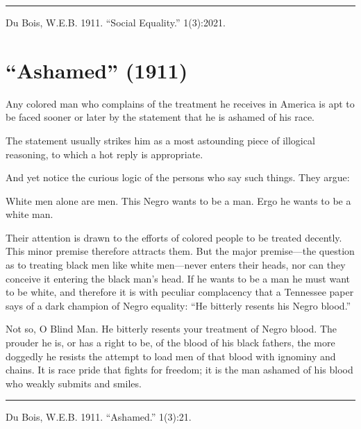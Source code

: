 \documentclass[letterpaper,10pt,english]{jupyterBook}
\begin{document}
\bigskip\hrule\bigskip


\sphinxAtStartPar
{} Du Bois, W.E.B. 1911. “Social Equality.”  1(3):20\sphinxhyphen{}21.


\section{“Ashamed” (1911)}
\label{\detokenize{Volumes/01/03/ashamed:ashamed-1911}}\label{\detokenize{Volumes/01/03/ashamed::doc}}
\sphinxAtStartPar
Any colored man who complains of the treatment he receives in America is apt to be faced sooner or later by the statement that he is ashamed of his race.

\sphinxAtStartPar
The statement usually strikes him as a most astounding piece of illogical reasoning, to which a hot reply is appropriate.

\sphinxAtStartPar
And yet notice the curious logic of the persons who say such things. They argue:

\sphinxAtStartPar
White men alone are men. This Negro wants to be a man. Ergo he wants to be a white man.

\sphinxAtStartPar
Their attention is drawn to the efforts of colored people to be treated decently. This minor premise therefore attracts them. But the major premise—the question as to treating black men like white men—never enters their heads, nor can they conceive it entering the black man’s head. If he wants to be a man he must want to be white, and therefore it is with peculiar complacency that a Tennessee paper says of a dark champion of Negro equality: “He bitterly resents his Negro blood.”

\sphinxAtStartPar
Not so, O Blind Man. He bitterly resents your treatment of Negro blood. The prouder he is, or has a right to be, of the blood of his black fathers, the more doggedly he resists the attempt to load men of that blood with ignominy and chains. It is race pride that fights for freedom; it is the man ashamed of his blood who weakly submits and smiles.


\bigskip\hrule\bigskip


\sphinxAtStartPar
{} Du Bois, W.E.B. 1911. “Ashamed.”  1(3):21.
\end{document}

